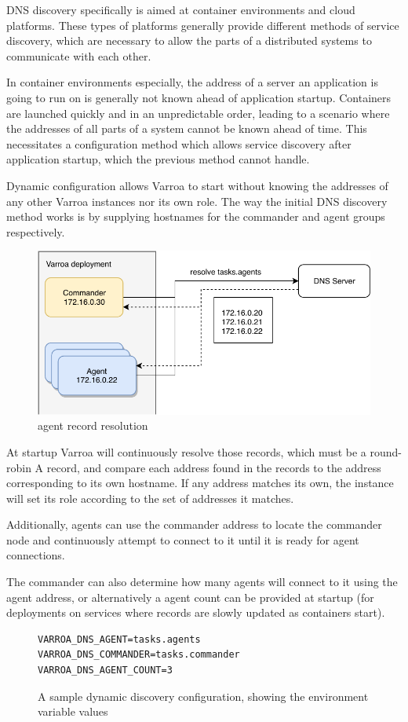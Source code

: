 DNS discovery specifically is aimed at container environments and cloud platforms. These types of platforms generally provide different methods of service discovery, which are necessary to allow the parts of a distributed systems to communicate with each other.

In container environments especially, the address of a server an application is going to run on is generally not known ahead of application startup. Containers are launched quickly and in an unpredictable order, leading to a scenario where the addresses of all parts of a system cannot be known ahead of time. This necessitates a configuration method which allows service discovery after application startup, which the previous method cannot handle.

Dynamic configuration allows Varroa to start without knowing the addresses of any other Varroa instances nor its own role. The way the initial DNS discovery method works is by supplying hostnames for the commander and agent groups respectively.


\begin{figure}[h]
\begin{center}
\includegraphics[scale=0.65]{Resources/PDF/ExecutionDnsDiscovery}
\caption{agent record resolution}
\end{center}
\end{figure}

At startup Varroa will continuously resolve those records, which must be a round-robin A record, and compare each address found in the records to the address corresponding to its own hostname. If any address matches its own, the instance will set its role according to the set of addresses it matches.

Additionally, agents can use the commander address to locate the commander node and continuously attempt to connect to it until it is ready for agent connections.

The commander can also determine how many agents will connect to it using the agent address, or alternatively a agent count can be  provided at startup (for deployments on services where records are slowly updated as containers start).

\begin{figure}
\begin{lstlisting}
VARROA_DNS_AGENT=tasks.agents
VARROA_DNS_COMMANDER=tasks.commander
VARROA_DNS_AGENT_COUNT=3
\end{lstlisting}
\caption{A sample dynamic discovery configuration, showing the environment variable values}
\end{figure}